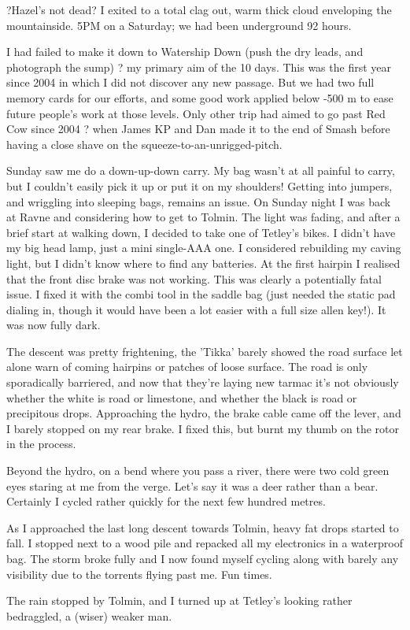 ?Hazel's not dead?
I exited to a total clag out, warm thick cloud enveloping the mountainside.
5PM on a Saturday; we had been underground 92 hours.

I had failed to make it down to Watership Down (push the dry leads, and photograph the sump) ? my primary aim of the 10 days. This was the first year since 2004 in which I did not discover any new passage. But we had two full memory cards for our efforts, and some good work applied below -500 m to ease future people's work at those levels. Only other trip had aimed to go past Red Cow since 2004 ? when James KP and Dan made it to the end of Smash before having a close shave on the squeeze-to-an-unrigged-pitch.

Sunday saw me do a down-up-down carry. My bag wasn't at all painful to carry, but I couldn't easily pick it up or put it on my shoulders! Getting into jumpers, and wriggling into sleeping bags, remains an issue.
On Sunday night I was back at Ravne and considering how to get to Tolmin. The light was fading, and after a brief start at walking down, I decided to take one of Tetley's bikes. I didn't have my big head lamp, just a mini single-AAA one. I considered rebuilding my caving light, but I didn't know where to find any batteries.
At the first hairpin I realised that the front disc brake was not working. This was clearly a potentially fatal issue.
I fixed it with the combi tool in the saddle bag (just needed the static pad dialing in, though it would have been a lot easier with a full size allen key!). It was now fully dark.

The descent was pretty frightening, the 'Tikka' barely showed the road surface let alone warn of coming hairpins or patches of loose surface. The road is only sporadically barriered, and now that they're laying new tarmac it's not obviously whether the white is road or limestone, and whether the black is road or precipitous drops. Approaching the hydro, the brake cable came off the lever, and I barely stopped on my rear brake. I fixed this, but burnt my thumb on the rotor in the process.

Beyond the hydro, on a bend where you pass a river, there were two cold green eyes staring at me from the verge. Let's say it was a deer rather than a bear. Certainly I cycled rather quickly for the next few hundred metres.

As I approached the last long descent towards Tolmin, heavy fat drops started to fall. I stopped next to a wood pile and repacked all my electronics in a waterproof bag. The storm broke fully and I now found myself cycling along with barely any visibility due to the torrents flying past me. Fun times.

The rain stopped by Tolmin, and I turned up at Tetley's looking rather bedraggled, a (wiser) weaker man.

